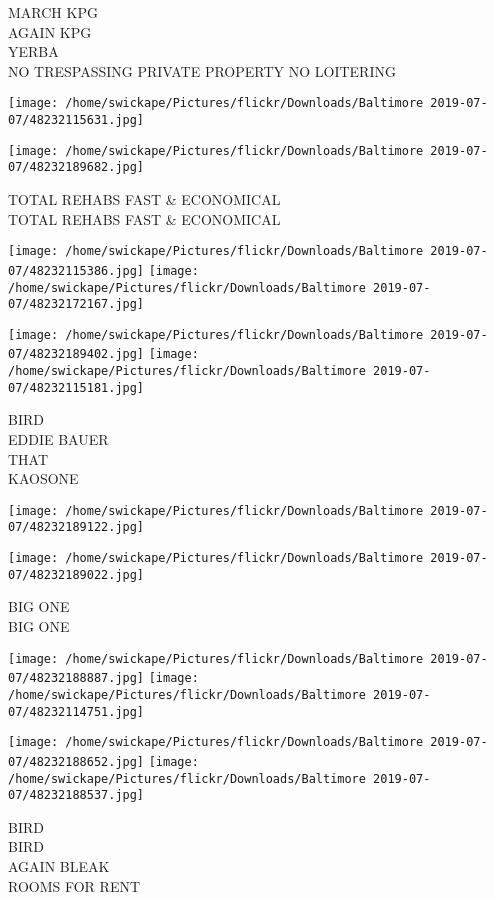 \documentclass[10pt,letterpaper]{article}
\begin{document}
MARCH KPG\\
AGAIN KPG\\
YERBA\\
NO TRESPASSING PRIVATE PROPERTY NO LOITERING
\pagebreak

\texttt{[image: /home/swickape/Pictures/flickr/Downloads/Baltimore 2019-07-07/48232115631.jpg]}

\vspace{0.25in}
\texttt{[image: /home/swickape/Pictures/flickr/Downloads/Baltimore 2019-07-07/48232189682.jpg]}

TOTAL REHABS FAST \& ECONOMICAL\\
TOTAL REHABS FAST \& ECONOMICAL
\pagebreak

\texttt{[image: /home/swickape/Pictures/flickr/Downloads/Baltimore 2019-07-07/48232115386.jpg]}
\texttt{[image: /home/swickape/Pictures/flickr/Downloads/Baltimore 2019-07-07/48232172167.jpg]}

\texttt{[image: /home/swickape/Pictures/flickr/Downloads/Baltimore 2019-07-07/48232189402.jpg]}
\texttt{[image: /home/swickape/Pictures/flickr/Downloads/Baltimore 2019-07-07/48232115181.jpg]}

BIRD\\
EDDIE BAUER\\
THAT\\
KAOSONE
\pagebreak

\texttt{[image: /home/swickape/Pictures/flickr/Downloads/Baltimore 2019-07-07/48232189122.jpg]}

\vspace{0.25in}
\texttt{[image: /home/swickape/Pictures/flickr/Downloads/Baltimore 2019-07-07/48232189022.jpg]}

BIG ONE\\
BIG ONE
\pagebreak

\texttt{[image: /home/swickape/Pictures/flickr/Downloads/Baltimore 2019-07-07/48232188887.jpg]}
\texttt{[image: /home/swickape/Pictures/flickr/Downloads/Baltimore 2019-07-07/48232114751.jpg]}

\texttt{[image: /home/swickape/Pictures/flickr/Downloads/Baltimore 2019-07-07/48232188652.jpg]}
\texttt{[image: /home/swickape/Pictures/flickr/Downloads/Baltimore 2019-07-07/48232188537.jpg]}

BIRD\\
BIRD\\
AGAIN BLEAK\\
ROOMS FOR RENT
\pagebreak
\end{document}
